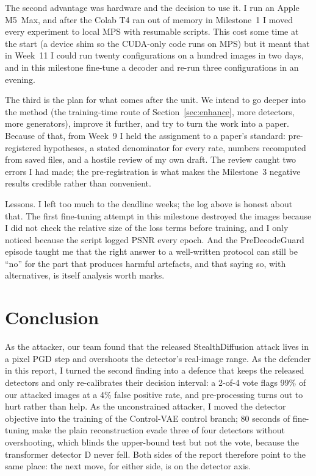 \documentclass[journal]{IEEEtran}
\begin{document}
The second advantage was hardware and the decision to use it. I run an Apple M5~Max, and after the Colab T4 ran out of memory in Milestone~1 I moved every experiment to local MPS with resumable scripts. This cost some time at the start (a device shim so the CUDA-only code runs on MPS) but it meant that in Week~11 I could run twenty configurations on a hundred images in two days, and in this milestone fine-tune a decoder and re-run three configurations in an evening.

The third is the plan for what comes after the unit. We intend to go deeper into the method (the training-time route of Section~\ref{sec:enhance}, more detectors, more generators), improve it further, and try to turn the work into a paper. Because of that, from Week~9 I held the assignment to a paper's standard: pre-registered hypotheses, a stated denominator for every rate, numbers recomputed from saved files, and a hostile review of my own draft. The review caught two errors I had made; the pre-registration is what makes the Milestone~3 negative results credible rather than convenient.

Lessons. I left too much to the deadline weeks; the log above is honest about that. The first fine-tuning attempt in this milestone destroyed the images because I did not check the relative size of the loss terms before training, and I only noticed because the script logged PSNR every epoch. And the PreDecodeGuard episode taught me that the right answer to a well-written protocol can still be ``no'' for the part that produces harmful artefacts, and that saying so, with alternatives, is itself analysis worth marks.

\section{Conclusion}
\label{sec:conclusion}

As the attacker, our team found that the released StealthDiffusion attack lives in a pixel PGD step and overshoots the detector's real-image range. As the defender in this report, I turned the second finding into a defence that keeps the released detectors and only re-calibrates their decision interval: a 2-of-4 vote flags 99\% of our attacked images at a 4\% false positive rate, and pre-processing turns out to hurt rather than help. As the unconstrained attacker, I moved the detector objective into the training of the Control-VAE control branch; 80 seconds of fine-tuning make the plain reconstruction evade three of four detectors without overshooting, which blinds the upper-bound test but not the vote, because the transformer detector D never fell. Both sides of the report therefore point to the same place: the next move, for either side, is on the detector axis.



\end{document}
